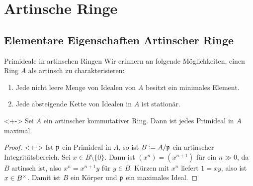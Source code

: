 \section{Artinsche Ringe}

\subsection{Elementare Eigenschaften Artinscher Ringe}

\begin{frame}{Primideale in artinschen Ringen}
	Wir erinnern an folgende Möglichkeiten, einen Ring \(A\) als artinsch zu
	charakterisieren:
	\begin{enumerate}[<+->]
	\item
		Jede nicht leere Menge von Idealen von \(A\) besitzt ein minimales Element.
	\item
		Jede absteigende Kette von Idealen in \(A\) ist stationär.
	\end{enumerate}
	\begin{proposition}<+->
		Sei \(A\) ein artinscher kommutativer Ring. Dann ist jedes Primideal
		in \(A\) maximal.
	\end{proposition}
	\begin{proof}<+->
		Ist \(\mathfrak{p}\) ein Primideal in \(A\), so ist
		\(B \coloneqq A/\mathfrak{p}\) ein artinscher Integritätsbereich.
		Sei \(x \in B \setminus \{0\}\). Dann ist \((x^n) = (x^{n + 1})\) für
		ein \(n \gg 0\), da \(B\) artinsch ist, also \(x^n = x^{n + 1} y\)
		für \(y \in B\). Kürzen mit \(x^n\) liefert \(1 = xy\), also ist
		\(x \in B^\times\). Damit ist \(B\) ein Körper und \(\mathfrak{p}\) ein
		maximales Ideal.
	\end{proof}
\end{frame}

